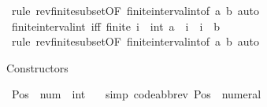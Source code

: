 \begin{isabellebody}
\ {\isacharparenleft}{\kern0pt}rule\ rev{\isacharunderscore}{\kern0pt}finite{\isacharunderscore}{\kern0pt}subset{\isacharbrackleft}{\kern0pt}OF\ finite{\isacharunderscore}{\kern0pt}interval{\isacharunderscore}{\kern0pt}int{}{\isacharbrackleft}{\kern0pt}of\ {\isachardoublequoteopen}a{\isachardoublequoteclose}\ {\isachardoublequoteopen}b{\isachardoublequoteclose}{\isacharbrackright}{\kern0pt}{\isacharbrackright}{\kern0pt}{\isacharparenright}{\kern0pt}\ auto%
\endisatagproof
{\isafoldproof}%
%
\isadelimproof
\isanewline
%
\endisadelimproof
\isanewline
{}\isamarkupfalse%
\ finite{\isacharunderscore}{\kern0pt}interval{\isacharunderscore}{\kern0pt}int{}\ {\isacharbrackleft}{\kern0pt}iff{\isacharbrackright}{\kern0pt}{\isacharcolon}{\kern0pt}\ {\isachardoublequoteopen}finite\ {\isacharbraceleft}{\kern0pt}i\ {\isacharcolon}{\kern0pt}{\isacharcolon}{\kern0pt}\ int{\isachardot}{\kern0pt}\ a\ {\isacharless}{\kern0pt}\ i\ {\isasymand}\ i\ {\isacharless}{\kern0pt}\ b{\isacharbraceright}{\kern0pt}{\isachardoublequoteclose}\isanewline
%
\isadelimproof
\ \ %
\endisadelimproof
%
\isatagproof
{}\isamarkupfalse%
\ {\isacharparenleft}{\kern0pt}rule\ rev{\isacharunderscore}{\kern0pt}finite{\isacharunderscore}{\kern0pt}subset{\isacharbrackleft}{\kern0pt}OF\ finite{\isacharunderscore}{\kern0pt}interval{\isacharunderscore}{\kern0pt}int{}{\isacharbrackleft}{\kern0pt}of\ {\isachardoublequoteopen}a{\isachardoublequoteclose}\ {\isachardoublequoteopen}b{\isachardoublequoteclose}{\isacharbrackright}{\kern0pt}{\isacharbrackright}{\kern0pt}{\isacharparenright}{\kern0pt}\ auto%
\endisatagproof
{\isafoldproof}%
%
\isadelimproof
%
\endisadelimproof
%
\isadelimdocument
%
\endisadelimdocument
%
\isatagdocument
%
\isamarkuptrue%
%
\endisatagdocument
{\isafolddocument}%
%
\isadelimdocument
%
\endisadelimdocument
%
\begin{isamarkuptext}%
Constructors%
\end{isamarkuptext}\isamarkuptrue%
\isamarkupfalse%
\ Pos\ {\isacharcolon}{\kern0pt}{\isacharcolon}{\kern0pt}\ {\isachardoublequoteopen}num\ {\isasymRightarrow}\ int{\isachardoublequoteclose}\isanewline
\ \ \ {\isacharbrackleft}{\kern0pt}simp{\isacharcomma}{\kern0pt}\ code{\isacharunderscore}{\kern0pt}abbrev{\isacharbrackright}{\kern0pt}{\isacharcolon}{\kern0pt}\ {\isachardoublequoteopen}Pos\ {\isacharequal}{\kern0pt}\ numeral{\isachardoublequoteclose}\isanewline
\isanewline
{}\isamarkupfalse%

\end{isabellebody}
